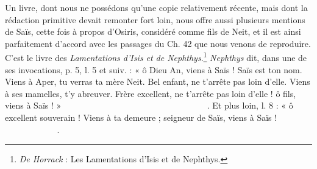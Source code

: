 \documentclass[a4paper, 11pt, oneside]{article}
\newcommand*\hieroglyhicsAAAD{}
\newcommand*\hieroglyhicsAAAG{}
\newcommand*\hieroglyhicsAAAH{}
\newcommand*\hieroglyhicsAAAI{}
\newcommand*\hieroglyhicsAAAW{\raisebox{0.5ex}{}}
\newcommand*\hieroglyhicsAABR{}
\newcommand*\hieroglyhicsAACD{}
\newcommand*\hieroglyhicsAACM{}
\newcommand*\hieroglyhicsAACY{}
\newcommand*\hieroglyhicsAADB{}
\newcommand*\hieroglyhicsAADC{\raisebox{0.5ex}{}}
\newcommand*\hieroglyhicsAADF{}
\newcommand*\hieroglyhicsAADG{}
\newcommand*\hieroglyhicsAADW{}
\newcommand*\hieroglyhicsAAEL{}
\newcommand*\hieroglyhicsAAEM{}
\newcommand*\hieroglyhicsAAEN{}
\newcommand*\hieroglyhicsAAEO{}
\newcommand*\hieroglyhicsAAEP{\raisebox{0.5ex}{}}
\newcommand*\hieroglyhicsAAEQ{}
\newcommand*\hieroglyhicsAAER{}
\newcommand*\hieroglyhicsAAES{\raisebox{0.5ex}{}}
\newcommand*\hieroglyhicsAAET{}
\newcommand*\hieroglyhicsAAEU{}
\newcommand*\hieroglyhicsAAEV{}
\newcommand*\hieroglyhicsAAEW{}
\newcommand*\hieroglyhicsAAEX{}
\newcommand*\hieroglyhicsAAEY{}
\newcommand*\hieroglyhicsAAEZ{}
\newcommand*\hieroglyhicsAAFA{}
\newcommand*\hieroglyhicsAAFB{}
\newcommand*\hieroglyhicsAAFC{}
\newcommand*\hieroglyhicsAAFD{}
\newcommand*\hieroglyhicsAAFE{}
\newcommand*\hieroglyhicsAAFF{}
\newcommand*\hieroglyhicsAAFG{}
\newcommand*\hieroglyhicsAAFH{}
\newcommand*\hieroglyhicsAAFI{}
\newcommand*\hieroglyhicsAAFJ{}
\newcommand*\hieroglyhicsAAFK{}
\newcommand*\hieroglyhicsAAFL{}
\newcommand*\hieroglyhicsAAFM{}
\newcommand*\hieroglyhicsAAFN{\raisebox{0.5ex}{}}
\newcommand*\hieroglyhicsAAFO{}
\newcommand*\hieroglyhicsAAFP{}
\newcommand*\hieroglyhicsAAFQ{}
\newcommand*\hieroglyhicsAAFR{}
\newcommand*\hieroglyhicsAAFS{}
\newcommand*\hieroglyhicsAAFT{}
\newcommand*\hieroglyhicsAAFU{}
\newcommand*\hieroglyhicsAAFV{}
\begin{document}
Un livre, dont nous ne possédons qu'une copie relativement récente, mais dont la rédaction primitive devait remonter fort loin, nous offre aussi plusieurs mentions de Saïs, cette fois à propos d'Osiris, considéré comme fils de Neit, et il est ainsi parfaitement d'accord avec les passages du Ch. 42 que nous venons de reproduire. C'est le livre des \emph{Lamentations d'Isis et de Nephthys}.\footnote{\emph{De Horrack} : Les Lamentations d'Isis et de Nephthys.} \emph{Nephthys} dit, dans une de ses invocations, p. 5, l. 5 et suiv. : « ô Dieu An, viens à Saïs ! Saïs est ton nom. Viens à Aper, tu verras ta mère Neit. Bel enfant, ne t'arrête pas loin d'elle. Viens à ses mamelles, t'y abreuver. Frère excellent, ne t'arrête pas loin d'elle ! ô fils, viens à Saïs ! » $\hieroglyhicsAAEL\:\hieroglyhicsAAEM\:\hieroglyhicsAADG\allowbreak\:\hieroglyhicsAAEN\:\hieroglyhicsAAEO\:\hieroglyhicsAAEP\allowbreak\:\hieroglyhicsAAAD\:\hieroglyhicsAAEQ\:\hieroglyhicsAADC\allowbreak\:\hieroglyhicsAAAW\:\hieroglyhicsAAAD\:\hieroglyhicsAAAG\allowbreak\:\hieroglyhicsAADC\:\hieroglyhicsAAAW\:\hieroglyhicsAAFU\allowbreak\:\hieroglyhicsAACM\:\hieroglyhicsAAER\:\hieroglyhicsAADB\allowbreak\:\hieroglyhicsAAES\:\hieroglyhicsAADG\:\hieroglyhicsAAEN\allowbreak\:\hieroglyhicsAAET\:\hieroglyhicsAAEU\:\hieroglyhicsAAAW\allowbreak\:\hieroglyhicsAAEV\:\hieroglyhicsAAEW\:\hieroglyhicsAACY\allowbreak\:\hieroglyhicsAAES\:\hieroglyhicsAAEX\:\hieroglyhicsAAEY\allowbreak\:\hieroglyhicsAAEZ\:\hieroglyhicsAAFA\:\hieroglyhicsAAFB\allowbreak\:\hieroglyhicsAAEM\:\hieroglyhicsAADW\:\hieroglyhicsAAFC\allowbreak\:\hieroglyhicsAAFD\:\hieroglyhicsAAFE\:\hieroglyhicsAAFF\allowbreak\:\hieroglyhicsAADG\:\hieroglyhicsAAAH\:\hieroglyhicsAAFG\allowbreak\:\hieroglyhicsAAFH\:\hieroglyhicsAAFI\:\hieroglyhicsAAFJ\allowbreak\:\hieroglyhicsAAFD\:\hieroglyhicsAAFK\:\hieroglyhicsAAEZ\allowbreak\:\hieroglyhicsAACM\:\hieroglyhicsAAFL\:\hieroglyhicsAAFM\allowbreak\:\hieroglyhicsAAAH\:\hieroglyhicsAABR\:\hieroglyhicsAAFN\allowbreak\:\hieroglyhicsAAFO\:\hieroglyhicsAAAH\:\hieroglyhicsAADB\allowbreak\:\hieroglyhicsAAFB\:\hieroglyhicsAAEM\:\hieroglyhicsAADW\allowbreak\:\hieroglyhicsAAFC\:\hieroglyhicsAAFD\:\hieroglyhicsAAFE\allowbreak\:\hieroglyhicsAAFF\:\hieroglyhicsAAAH\:\hieroglyhicsAADF\allowbreak\:\hieroglyhicsAAAI\:\hieroglyhicsAADB\:\hieroglyhicsAADG\allowbreak\:\hieroglyhicsAAAH\:\hieroglyhicsAAEO\allowbreak\:\hieroglyhicsAAEP\:\hieroglyhicsAAAD\allowbreak\:\hieroglyhicsAAEQ\:\hieroglyhicsAADC\:\hieroglyhicsAAFP$. Et plus loin, l. 8 : « ô excellent souverain ! Viens à ta demeure ; seigneur de Saïs, viens à Saïs ! $\hieroglyhicsAAAH\:\hieroglyhicsAADF\:\hieroglyhicsAAAH\allowbreak\:\hieroglyhicsAACD\:\hieroglyhicsAAAH\:\hieroglyhicsAAAH\allowbreak\:\hieroglyhicsAAFQ\:\hieroglyhicsAADB\:\hieroglyhicsAAFB\allowbreak\:\hieroglyhicsAAFV\:\hieroglyhicsAADG\:\hieroglyhicsAAAH\:\hieroglyhicsAAEO\allowbreak\:\hieroglyhicsAAEP\:\hieroglyhicsAAFR\:\hieroglyhicsAAFS\:\hieroglyhicsAAAD\allowbreak\:\hieroglyhicsAAEQ\:\hieroglyhicsAADC\:\hieroglyhicsAAFT\:\hieroglyhicsAADG\allowbreak\:\hieroglyhicsAAAH\:\hieroglyhicsAAEO\:\hieroglyhicsAAEP\allowbreak\:\hieroglyhicsAAAD\:\hieroglyhicsAAAG\:\hieroglyhicsAADC\:\hieroglyhicsAAFT$.
\end{document}
